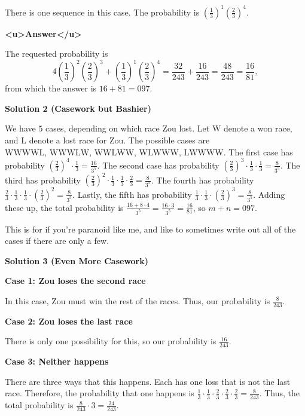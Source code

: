\begin{enumerate}
 There is one sequence in this case. The probability is $\left(\frac13\right)^1\left(\frac23\right)^4.$

 \textbf{<u>Answer</u>}

 The requested probability is 
 \[4\left(\frac13\right)^2\left(\frac23\right)^3+\left(\frac13\right)^1\left(\frac23\right)^4=\frac{32}{243}+\frac{16}{243}=\frac{48}{243}=\frac{16}{81},\] from which the answer is $16+81=\boxed{097}.$




\textbf{Solution 2 (Casework but Bashier)}

We have $5$ cases, depending on which race Zou lost. Let $\text{W}$ denote a won race, and $\text{L}$ denote a lost race for Zou. The possible cases are $\text{WWWWL, WWWLW, WWLWW, WLWWW, LWWWW}$. The first case has probability $\left(\frac{2}{3} \right)^4 \cdot \frac{1}{3} = \frac{16}{3^5}$. The second case has probability $\left( \frac{2}{3} \right)^3 \cdot \frac{1}{3} \cdot \frac{1}{3} = \frac{8}{3^5}$. The third has probability $\left( \frac{2}{3} \right)^2 \cdot \frac{1}{3} \cdot \frac{1}{3} \cdot \frac{2}{3} = \frac{8}{3^5}$. The fourth has probability $\frac{2}{3} \cdot \frac{1}{3} \cdot \frac{1}{3} \cdot \left( \frac{2}{3} \right)^2 = \frac{8}{3^5}$. Lastly, the fifth has probability $\frac{1}{3} \cdot \frac{1}{3} \cdot \left( \frac{2}{3} \right)^3 = \frac{8}{3^5}$. Adding these up, the total probability is $\frac{16 + 8 \cdot 4}{3^5} = \frac{16 \cdot 3}{3^5} = \frac{16}{81}$, so $m+n = \boxed{097}$.

 This is for if you're paranoid like me, and like to sometimes write out all of the cases if there are only a few.

 



\textbf{Solution 3 (Even More Casework)}

\textbf{ Case 1: Zou loses the second race }

 In this case, Zou must win the rest of the races. Thus, our probability is $\frac{8}{243}$.

 \textbf{ Case 2: Zou loses the last race }

 There is only one possibility for this, so our probability is $\frac{16}{243}$.

 \textbf{ Case 3: Neither happens }

 There are three ways that this happens. Each has one loss that is not the last race. Therefore, the probability that one happens is $\frac{1}{3} \cdot \frac{1}{3} \cdot \frac{2}{3} \cdot \frac{2}{3} \cdot \frac{2}{3} = \frac{8}{243}$. Thus, the total probability is $\frac{8}{243} \cdot 3 = \frac{24}{243}$.


\end{enumerate}
